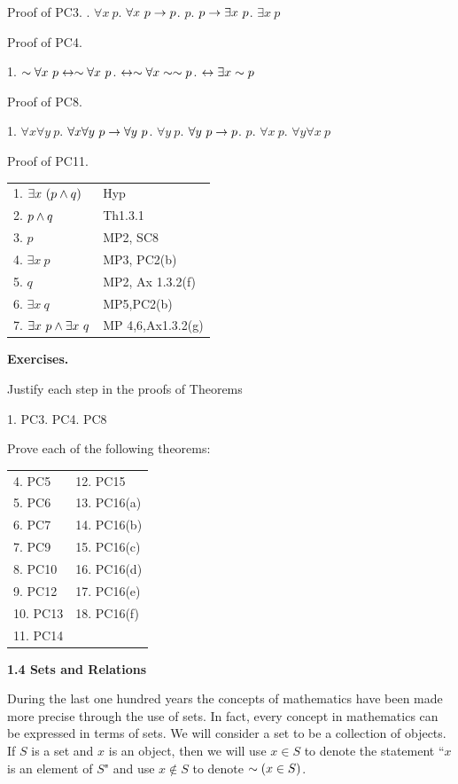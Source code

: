 \begin{large}
Proof of PC3. . $\forall x~p$. $\forall x~p \to p$. $p$. $p \to \exists x~p$. $\exists x ~p$\nl

\newpage
Proof of PC4.\nl

1.  $\sim \forall x~p \leftrightarrow \sim \forall x~p$.  \qqu $\leftrightarrow \sim \forall x \sim \sim p$.  \qqu $\leftrightarrow \exists x \sim p$\nl

Proof of PC8.\nl

1. $\forall x\forall y ~p$. $\forall x\forall y ~p \to \forall y~p$. $\forall y~p$. $\forall y~p \to p$. $p$. $\forall x~p$. $\forall y \forall x ~p$\nl

Proof of PC11. \nl
\begin{tabular}{ l l}
1. $\exists x~(p \wedge q)$ & Hyp \\
2. $p \wedge q$ & Th1.3.1 \\
3. $p$ & MP2, SC8 \\
4. $\exists x~p$ & MP3, PC2(b)\\
5. $q$ & MP2, Ax 1.3.2(f)\\
6. $\exists x ~q$ & MP5,PC2(b) \\
7. $\exists x~p \wedge \exists x~q$ & MP 4,6,Ax1.3.2(g)\\
\end{tabular}\nl

\textbf{Exercises.}\nl

Justify each step in the proofs of Theorems \nl

1. PC3. PC4. PC8\nl

Prove each of the following theorems:\nl

\begin{tabular}{l l}
4. PC5  &12. PC15\\
5. PC6 &13. PC16(a)\\
6. PC7 &14. PC16(b)\\
7. PC9 &15. PC16(c)\\
8. PC10 &16.  PC16(d)\\
9.  PC12 &17.  PC16(e)\\
10.  PC13 &18. PC16(f)\\
11. PC14 &\\
\end{tabular}\nl

\newpage
\textbf{1.4 Sets and Relations} \nl

 During the last one hundred years the concepts of mathematics have been made more precise through the use of sets. In fact, every concept in mathematics can be expressed in terms of sets. We will consider a set to be a collection of objects. If $S$ is a set and $x$ is an object, then we will use $x \in S$ to denote the statement ``$x$ is an element of $S$" and use $x \notin S$ to denote  $\sim (x \in S)$. \nl


\end{large}
